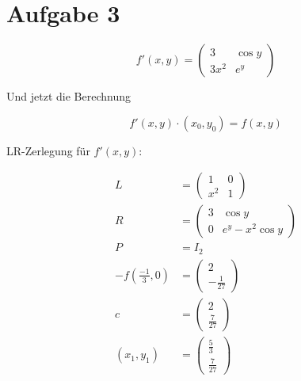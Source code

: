 \section*{Aufgabe 3}
\[f' (x,y) = \begin{pmatrix}
	3     & \cos y\\
	3 x^2 & e^y
\end{pmatrix}\]

Und jetzt die Berechnung

\[f'(x, y) \cdot (x_0, y_0) = f(x,y)\]

LR-Zerlegung für $f'(x, y)$:

\begin{align}
	L &= \begin{pmatrix}1 &0 \\ x^2 & 1\end{pmatrix}\\
	R &= \begin{pmatrix}3 & \cos y \\ 0 & e^y - x^2 \cos y\end{pmatrix}\\
	P &= I_2\\
-f ( \frac{-1}{3}, 0) &= \begin{pmatrix} 2\\ -\frac{1}{27}\end{pmatrix}\\
c &= \begin{pmatrix} 2\\ \frac{7}{27} \end{pmatrix}\\
(x_1, y_1) &= \begin{pmatrix} \frac{5}{3}\\ \frac{7}{27}\end{pmatrix}
\end{align}
